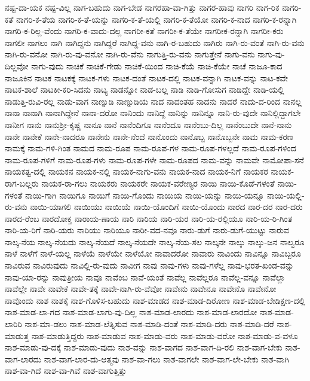 {ನಷ್ಟ-ದಾ-ಯಕ
ನಷ್ಟ-ವಿಲ್ಲ
ನಾಗ-ಬಹುದು
ನಾಗ-ಬೇಡ
ನಾಗರಹಾ-ವಾ-ಗಿತ್ತು
ನಾಗರ-ಹಾವು
ನಾಗರಿ
ನಾಗ-ರಿಕ
ನಾಗರಿ-ಕತೆ
ನಾಗರಿ-ಕ-ತೆಯ
ನಾಗರಿ-ಕ-ತೆ-ಯನ್ನು
ನಾಗರಿ-ಕ-ತೆ-ಯಲ್ಲಿ
ನಾಗರಿ-ಕ-ತೆಯೋ
ನಾಗರಿ-ಕ-ನಾದ
ನಾಗರಿ-ಕ-ರನ್ನಾಗಿ
ನಾಗರಿ-ಕ-ರಿಲ್ಲ-ವೆಂದು
ನಾಗರಿ-ಕ-ವಾದು-ದಲ್ಲ
ನಾಗರೀ-ಕತೆ
ನಾಗರೀ-ಕ-ತೆಯೇ
ನಾಗರೀಕ-ರನ್ನಾಗಿ
ನಾಗರೀ-ಕರು
ನಾಗಲೀ
ನಾಗಲು
ನಾಗಿ
ನಾಗಿದ್ದನು
ನಾಗಿದ್ದರೆ
ನಾಗಿದ್ದ-ವನು
ನಾಗಿ-ರ-ಬಹುದು
ನಾಗಿರು
ನಾಗಿ-ರು-ವಂತೆ
ನಾಗಿ-ರು-ವನು
ನಾಗಿ-ರು-ವನೋ
ನಾಗಿ-ರು-ವು-ವನೋ
ನಾಗಿ-ರು-ವೆನು
ನಾಗುತ್ತಿ-ರು-ವನು
ನಾಗುತ್ತೇನೆ
ನಾಗು-ವನು
ನಾಗು-ವು-ದಿಲ್ಲವೋ
ನಾಗು-ವುದು
ನಾಚಿಕೆ
ನಾಚಿಕೆ-ಗೇಡು
ನಾಚಿಕೆ-ಯಿಂದ
ನಾಚಿ-ಕೆಯೆ
ನಾಚಿ-ಕೆಯೇ
ನಾಚೆ
ನಾಜೂ-ಕಾದ
ನಾಜೂಕಿನ
ನಾಟಕ
ನಾಟಕಕ್ಕೆ
ನಾಟಕ-ಗಳು
ನಾಟಕ-ದಂತೆ
ನಾಟಕ-ದಲ್ಲಿ
ನಾಟಕ-ವನ್ನಾಗಿ
ನಾಟಕ-ವನ್ನು
ನಾಟ-ಕವೇ
ನಾಟಕ-ಶಾಲೆ
ನಾಟಕೀ-ಕರಿ-ಸಿದನು
ನಾಟ್ಯ
ನಾಡನ್ನೋ
ನಾಡ-ಬಲ್ಲ
ನಾಡಿ
ನಾಡಿ-ಗೋಸುಗ
ನಾಡಿದ್ದೇ
ನಾಡಿ-ಯಲ್ಲಿ
ನಾಡುತ್ತಿ-ರುವಿ-ರಲ್ಲ
ನಾಡು-ವಾಗ
ನಾಣ್ನುಡಿ
ನಾಣ್ನುಡಿಯ
ನಾದ
ನಾದಂತಹ
ನಾದನು
ನಾದರೆ
ನಾದು-ದ-ರಿಂದ
ನಾನಲ್ಲ
ನಾನಾ
ನಾನಾಗಿ
ನಾನಾಗಿದ್ದೇನೆ
ನಾನಾ-ದರೋ
ನಾನಿಂದು
ನಾನಿದ್ದೆ
ನಾನಿನ್ನು
ನಾನಿನ್ನೂ
ನಾನಿ-ರು-ವುದೇ
ನಾನಿಲ್ಲಿದ್ದಾಗಲೇ
ನಾನೀಗ
ನಾನು
ನಾನುಶ್ರೀ-ಕೃಷ್ಣ
ನಾನೂ
ನಾನೆ
ನಾನೆಂದಿಗೂ
ನಾನೆಂದೂ
ನಾನೆಂಬು-ದಿಲ್ಲ
ನಾನೆಂಬುದೇ
ನಾನೆ-ನಾನು
ನಾನೇ
ನಾನೇಕೆ
ನಾನೇ-ನಾದರೂ
ನಾನೇನು
ನಾನೇ-ನೆಂದೆ
ನಾನೊಂದು
ನಾನೊಬ್ಬ
ನಾನೊಬ್ಬನೇ
ನಾಮ
ನಾಮ-ಕರಣ
ನಾಮಕ್ಕೆ
ನಾಮ-ಗಳಿ-ಗಿಂತ
ನಾಮದ
ನಾಮ-ರೂಪ
ನಾಮ-ರೂಪ-ಗಳ
ನಾಮ-ರೂಪ-ಗಳಲ್ಲದೆ
ನಾಮ-ರೂಪ-ಗಳಿಂದ
ನಾಮ-ರೂಪ-ಗಳಿಗೆ
ನಾಮ-ರೂಪ-ಗಳು
ನಾಮ-ರೂಪ-ಗಳೇ
ನಾಮ-ರೂಪದ
ನಾಮ-ವನ್ನು
ನಾಮವೇ
ನಾಮೋಪಾ-ಸನೆ
ನಾಯಕತ್ವ-ದಲ್ಲಿ
ನಾಯಕನ
ನಾಯಕ-ನಲ್ಲಿ
ನಾಯಕ-ನಾಗು-ವನು
ನಾಯಕ-ನಾದ
ನಾಯಕ-ನಿಗೆ
ನಾಯಕರ
ನಾಯಕ-ರಾಗ-ಬಲ್ಲರು
ನಾಯಕ-ರಾ-ಗಲು
ನಾಯಕರು
ನಾಯಕರೇ
ನಾಯಕ-ವರೇಣ್ಯರ
ನಾಯಿ
ನಾಯಿ-ಕೊಡೆ-ಗಳಂತೆ
ನಾಯಿ-ಗಳಂತೆ
ನಾಯಿ-ಗಾಗಿ
ನಾಯಿಗೂ
ನಾಯಿಗೆ
ನಾಯಿ-ಗೊಂದು
ನಾಯಿಯ
ನಾಯಿ-ಯನ್ನು
ನಾಯಿ-ಯನ್ನೂ
ನಾಯಿ-ಯಲ್ಲಿ-ರು-ವನು
ನಾಯಿ-ಯಾಗಲಿ
ನಾಯಿಯು
ನಾಯಿಯೆ
ನಾಯಿ-ಯೊಂದಿಗೆ
ನಾಯಿ-ಯೊಂದು
ನಾರದ
ನಾರ-ದರ
ನಾರ-ದರು
ನಾರದ-ರೆಂಬ
ನಾರದೋಕ್ತ
ನಾರಾಯ-ಣಾಯ
ನಾರಿ
ನಾರಿಯ
ನಾರಿ-ಯರ
ನಾರಿ-ಯ-ರಲ್ಲಿಯೂ
ನಾರಿ-ಯ-ರಿ-ಗಿಂತ
ನಾರಿ-ಯ-ರಿಗೆ
ನಾರಿ-ಯರು
ನಾರಿಯು
ನಾರಿಯೂ
ನಾರೀ-ವದ-ನವೂ
ನಾರು-ಡುಗೆ
ನಾರು-ಡುಗೆ-ಯುಟ್ಟು
ನಾರುವ
ನಾಲ್ಕ-ನೆಯ
ನಾಲ್ಕ-ನೆಯದು
ನಾಲ್ಕ-ನೆಯದೆ
ನಾಲ್ಕ-ನೆಯದೇ
ನಾಲ್ಕ-ನೆಯ-ಸಲ
ನಾಲ್ಕನೇ
ನಾಲ್ಕು
ನಾಲ್ಕು-ಜನ
ನಾಲ್ವರೂ
ನಾಳೆ
ನಾಳೆಗೆ
ನಾಳೆ-ಯಲ್ಲ
ನಾಳೆಯೆ
ನಾಳೆಯೇ
ನಾಳೆಯೋ
ನಾವಾದರೋ
ನಾವಾರು
ನಾವಿಂದು
ನಾವಿನ್ನೂ
ನಾವಿಬ್ಬರೂ
ನಾವಿರುವ
ನಾವಿರುವುದು
ನಾವಿಲ್ಲಿ-ರು-ವುದು
ನಾವೀಗ
ನಾವು
ನಾವು-ಗಳು
ನಾವು-ಗಳೆಲ್ಲ
ನಾವು-ಭರತ-ಖಂಡ-ವನ್ನು
ನಾವು-ಯಾ-ರನ್ನು
ನಾವುತ್ರೀಯ
ನಾವೂ
ನಾವೆಂಬ
ನಾವೆ-ಯಂತೆ
ನಾವೆಲ್ಲ
ನಾವೆಲ್ಲರೂ
ನಾವೆಲ್ಲ-ವನ್ನೂ
ನಾವೆಲ್ಲಾ
ನಾವೆಲ್ಲೇ
ನಾವೇ
ನಾವೇಕೆ
ನಾವೇ-ತಕ್ಕೆ
ನಾವೇ-ನಾಗಿ-ರು-ವೆವೋ
ನಾವೇನು
ನಾವೇನೂ
ನಾವೇನೊ
ನಾವೇನೋ
ನಾವೊಂದು
ನಾಶ
ನಾಶಕ್ಕೆ
ನಾಶ-ಗೊಳಿಸ-ಬಹುದು
ನಾಶ-ಮಾಡದ
ನಾಶ-ಮಾಡ-ದಿರೋಣ
ನಾಶ-ಮಾಡ-ಬೇಡಿಕ್ಷಣ-ದಲ್ಲಿ
ನಾಶ-ಮಾಡ-ಲಾ-ಗದ
ನಾಶ-ಮಾಡ-ಲಾಗು-ವು-ದಿಲ್ಲ
ನಾಶ-ಮಾಡ-ಲಾರದು
ನಾಶ-ಮಾಡ-ಲಾರದೋ
ನಾಶ-ಮಾಡ-ಲಾರಿರಿ
ನಾಶ-ಮಾ-ಡಲು
ನಾಶ-ಮಾಡ-ಲೆತ್ನಿಸುವ
ನಾಶ-ಮಾಡಿ-ದಂತೆ
ನಾಶ-ಮಾಡಿ-ದರು
ನಾಶ-ಮಾಡಿ-ದರೆ
ನಾಶ-ಮಾಡುತ್ತ
ನಾಶ-ಮಾಡುತ್ತಿದ್ದರು
ನಾಶ-ಮಾಡುವ
ನಾಶ-ಮಾಡು-ವರು
ನಾಶ-ಮಾಡು-ವರೋ
ನಾಶ-ಮಾಡು-ವ-ವಳೂ
ನಾಶ-ಮಾಡು-ವು-ದಕ್ಕೆ
ನಾಶ-ಮಾಡು-ವುದು
ನಾಶ-ವನ್ನು
ನಾಶ-ವಾಗದ
ನಾಶ-ವಾಗ-ದಿ-ರಲಿ
ನಾಶ-ವಾಗ-ಬೇಕು
ನಾಶ-ವಾಗ-ಲಾರದು
ನಾಶ-ವಾಗ-ಲಾರ-ದು-ಆತ್ಮವು
ನಾಶ-ವಾ-ಗಲು
ನಾಶ-ವಾಗಲೇ
ನಾಶ-ವಾಗ-ಲೇ-ಬೇಕು
ನಾಶ-ವಾಗಿ
ನಾಶ-ವಾ-ಗಿದೆ
ನಾಶ-ವಾ-ಗಿವೆ
ನಾಶ-ವಾಗುತ್ತಿತ್ತು
}
